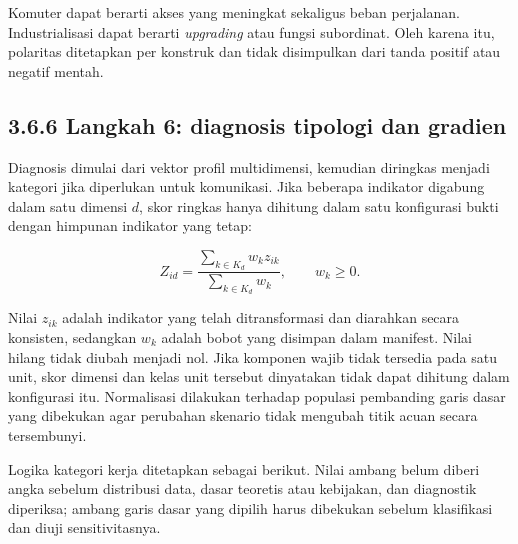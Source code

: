 \documentclass[
  indonesian,
  11pt,
  a4paper,
  oneside,
  openany]{report}
\begin{document}
Komuter dapat berarti akses yang meningkat sekaligus beban perjalanan.
Industrialisasi dapat berarti \emph{upgrading} atau fungsi subordinat.
Oleh karena itu, polaritas ditetapkan per konstruk dan tidak disimpulkan
dari tanda positif atau negatif mentah.

\subsection{3.6.6 Langkah 6: diagnosis tipologi dan
gradien}\label{langkah-6-diagnosis-tipologi-dan-gradien}

Diagnosis dimulai dari vektor profil multidimensi, kemudian diringkas
menjadi kategori jika diperlukan untuk komunikasi. Jika beberapa
indikator digabung dalam satu dimensi \(d\), skor ringkas hanya dihitung
dalam satu konfigurasi bukti dengan himpunan indikator yang tetap:

\[
Z_{id}=\frac{\sum_{k \in K_d} w_k z_{ik}}{\sum_{k \in K_d} w_k}, \qquad w_k \geq 0.
\]

Nilai \(z_{ik}\) adalah indikator yang telah ditransformasi dan
diarahkan secara konsisten, sedangkan \(w_k\) adalah bobot yang disimpan
dalam manifest. Nilai hilang tidak diubah menjadi nol. Jika komponen
wajib tidak tersedia pada satu unit, skor dimensi dan kelas unit
tersebut dinyatakan tidak dapat dihitung dalam konfigurasi itu.
Normalisasi dilakukan terhadap populasi pembanding garis dasar yang
dibekukan agar perubahan skenario tidak mengubah titik acuan secara
tersembunyi.

Logika kategori kerja ditetapkan sebagai berikut. Nilai ambang belum
diberi angka sebelum distribusi data, dasar teoretis atau kebijakan, dan
diagnostik diperiksa; ambang garis dasar yang dipilih harus dibekukan
sebelum klasifikasi dan diuji sensitivitasnya.
\end{document}
